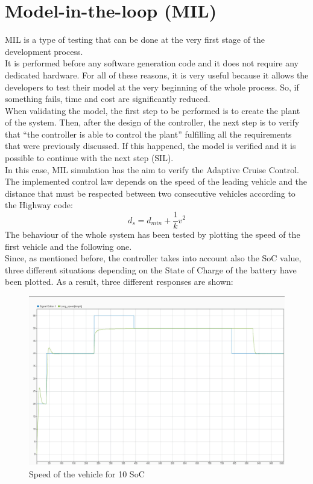 \documentclass[12pt,a4paper]{report}
\begin{document}
\section{Model-in-the-loop (MIL)}
MIL is a type of testing that can be done at the very first stage of the development process.\\
It is performed before any software generation code and it does not require any dedicated hardware. For all of these reasons, it is very useful because it allows the developers to test their model at the very beginning of the whole process. So, if something fails, time and cost are significantly reduced. \\
When validating the model, the first step to be performed is to create the plant of the system. Then, after the design of the controller, the next step is to verify that “the controller is able to control the plant” fulfilling all the requirements that were previously discussed. If this happened, the model is verified and it is possible to continue with the next step (SIL).\\
In this case, MIL simulation has the aim to verify the Adaptive Cruise Control. \\
The implemented control law  depends on the speed of the leading vehicle and the distance that must be respected between two consecutive vehicles according to the Highway code:\\
\begin{equation*}
	d_s=d_{min}+\dfrac{1}{k}v^2
\end{equation*}
The behaviour of the whole system has been tested by plotting the speed of the first vehicle and the following one.\\
Since, as mentioned before, the controller takes into account also the SoC value, three different situations depending on the State of Charge of the battery have been plotted. As a result, three different responses are shown:\\
\begin{figure}[htbp]
	\centering
	\includegraphics[scale=0.2]{10_soc.jpeg}
	\caption{Speed of the vehicle for 10 SoC}
\end{figure}
\end{document}
